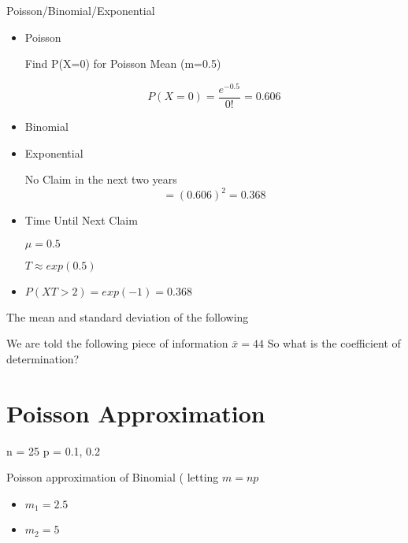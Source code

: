 \documentclass[]{report}
\begin{document}
Poisson/Binomial/Exponential

\begin{itemize}
\item  Poisson

Find P(X=0) for Poisson Mean (m=0.5)


\[ P(X=0) = \frac{e^{-0.5}}{0!}  = 0.606 \]


\item Binomial




\item Exponential

No Claim in the next two years
\[= (0.606)^2 = 0.368\]


\item Time Until Next Claim

$\mu= 0.5$

$T \approx exp(0.5)$

\item$P(XT >2) = exp(-1) = 0.368$

\end{itemize}








The mean and standard deviation of the following

We are told the following piece of information $\bar{x} = 44$
So what is the coefficient of determination?
















\section{Poisson Approximation}

n  = 25
p = 0.1, 0.2

Poisson approximation of Binomial ( letting $m=np$

\begin{itemize}
\item $m_1 = 2.5$
\item $m_2 = 5$
\end{itemize}
\end{document}
